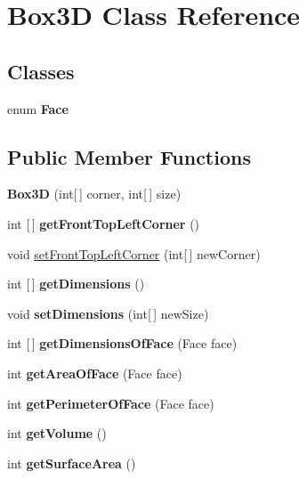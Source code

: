 \hypertarget{class_box3_d}{}\section{Box3D Class Reference}
\label{class_box3_d}
\subsection*{Classes}
\begin{DoxyCompactItemize}
\item 
enum {\bfseries Face}
\end{DoxyCompactItemize}
\subsection*{Public Member Functions}
\begin{DoxyCompactItemize}
\item 
\mbox{\label{class_box3_d_a3f14155b063a08ab3ac5aa43549bdae6}} 
{\bfseries Box3D} (int\mbox{[}$\,$\mbox{]} corner, int\mbox{[}$\,$\mbox{]} size)
\item 
\mbox{\label{class_box3_d_af8d43527a2b1f81bb2a0072cdfa4f64f}} 
int \mbox{[}$\,$\mbox{]} {\bfseries get\+Front\+Top\+Left\+Corner} ()
\item 
void \hyperlink{class_box3_d_aedca622a944e562d190b714c37b4c7c6}{set\+Front\+Top\+Left\+Corner} (int\mbox{[}$\,$\mbox{]} new\+Corner)
\item 
\mbox{\label{class_box3_d_aa0bde0e5618248e2e18a7d86c88297ff}} 
int \mbox{[}$\,$\mbox{]} {\bfseries get\+Dimensions} ()
\item 
\mbox{\label{class_box3_d_a1f624806e68394c2c7f8f12669a64b13}} 
void {\bfseries set\+Dimensions} (int\mbox{[}$\,$\mbox{]} new\+Size)
\item 
\mbox{\label{class_box3_d_a36b932991f293275559a0b49905ae714}} 
int \mbox{[}$\,$\mbox{]} {\bfseries get\+Dimensions\+Of\+Face} (Face face)
\item 
\mbox{\label{class_box3_d_a1426ce3a487b94893740cf80e3b103cf}} 
int {\bfseries get\+Area\+Of\+Face} (Face face)
\item 
\mbox{\label{class_box3_d_a75c4e2c9254a6cea643a9c3f7dfff939}} 
int {\bfseries get\+Perimeter\+Of\+Face} (Face face)
\item 
\mbox{\label{class_box3_d_aa1035d4325ff68b46ee75b05217ebc74}} 
int {\bfseries get\+Volume} ()
\item 
\mbox{\label{class_box3_d_a17ea2a784251bc1bd6fbc2279aa33fbd}} 
int {\bfseries get\+Surface\+Area} ()
\end{DoxyCompactItemize}
